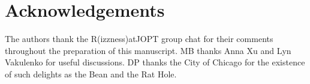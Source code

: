 \documentclass[%
reprint,
twocolumn,
nofootinbib,
 amsmath,amssymb,
 aps,
]{revtex4-2}
\begin{document}
\section*{Acknowledgements}
The authors thank the R(izzness)atJOPT group chat for their comments throughout the preparation of this manuscript. MB thanks Anna Xu and Lyn Vakulenko for useful discussions. DP thanks the City of Chicago for the existence of such delights as the Bean and the Rat Hole.




\end{document}

